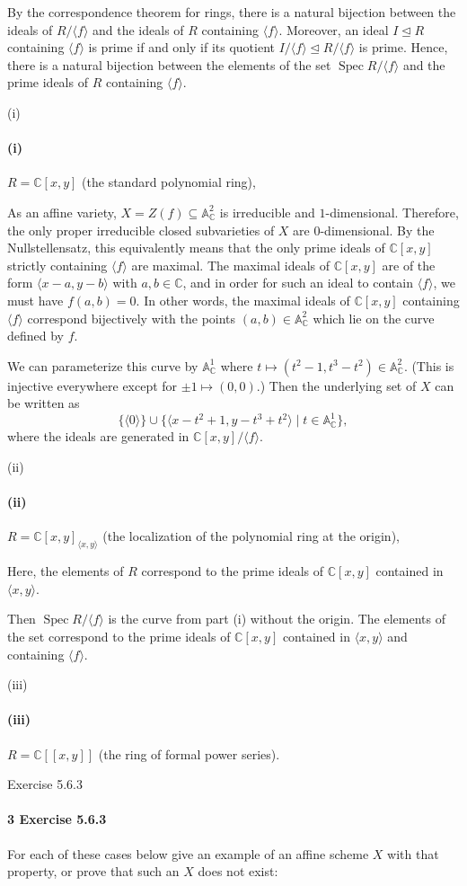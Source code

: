 \documentclass[12pt]{article}
\newlength{\myparskip}
\newenvironment{fullbox}{\begin{lrbox}{\savefullbox}\begin{minipage}{\dimexpr\textwidth-2\fboxsep\relax}\setlength{\parskip}{\myparskip}}{\end{minipage}\end{lrbox}\framebox[\textwidth]{\usebox{\savefullbox}}}
\newenvironment{pbox}[1][]{\begin{fullbox}\ifx#1\empty\else\paragraph{#1}\phantom{}\fi}{\end{fullbox}}
\theoremstyle{definition}
\newcommand{\C}{\mathbb{C}}
\newcommand{\A}{\mathbb{A}}
\newcommand{\<}{\langle}
\renewcommand{\>}{\rangle}
\newcommand{\teq}{\trianglelefteq}
\DeclareMathOperator{\Spec}{Spec}
\begin{document}
By the correspondence theorem for rings, there is a natural bijection between the ideals of $R/\<f\>$ and the ideals of $R$ containing $\<f\>$.
Moreover, an ideal $I \teq R$ containing $\<f\>$ is prime if and only if its quotient $I/\<f\> \teq R/\<f\>$ is prime.
Hence, there is a natural bijection between the elements of the set $\Spec R/\<f\>$ and the prime ideals of $R$ containing $\<f\>$.

\begin{pbox}[(i)]
    $R = \C[x, y]$ (the standard polynomial ring),
\end{pbox}

As an affine variety, $X = Z(f) \subseteq \A_\C^2$ is irreducible and $1$-dimensional.
Therefore, the only proper irreducible closed subvarieties of $X$ are $0$-dimensional.
By the Nullstellensatz, this equivalently means that the only prime ideals of $\C[x, y]$ strictly containing $\<f\>$ are maximal.
The maximal ideals of $\C[x, y]$ are of the form $\<x - a, y - b\>$ with $a, b \in \C$, and in order for such an ideal to contain $\<f\>$, we must have $f(a, b) = 0$.
In other words, the maximal ideals of $\C[x, y]$ containing $\<f\>$ correspond bijectively with the points $(a, b) \in \A_\C^2$ which lie on the curve defined by $f$.

We can parameterize this curve by $\A_\C^1$ where $t \mapsto (t^2 - 1, t^3 - t^2) \in \A_\C^2$.
(This is injective everywhere except for $\pm1 \mapsto (0, 0)$.)
Then the underlying set of $X$ can be written as
\[
    \{\<0\>\} \cup \{\<x - t^2 + 1, y - t^3 + t^2\> \mid t \in \A_\C^1\},
\]
where the ideals are generated in $\C[x, y]/\<f\>$.

\begin{pbox}[(ii)]
    $R = \C[x, y]_{\<x, y\>}$ (the localization of the polynomial ring at the origin),
\end{pbox}

Here, the elements of $R$ correspond to the prime ideals of $\C[x, y]$ contained in $\<x, y\>$.

Then $\Spec R/\<f\>$ is the curve from part (i) without the origin.
The elements of the set correspond to the prime ideals of $\C[x, y]$ contained in $\<x, y\>$ and containing $\<f\>$.

\begin{pbox}[(iii)]
    $R = \C[[x, y]]$ (the ring of formal power series).
\end{pbox}





\newpage
\begin{pbox}[3 Exercise 5.6.3]
    For each of these cases below give an example of an affine scheme $X$ with that property, or prove that such an $X$ does not exist:
\end{pbox}
\end{document}
